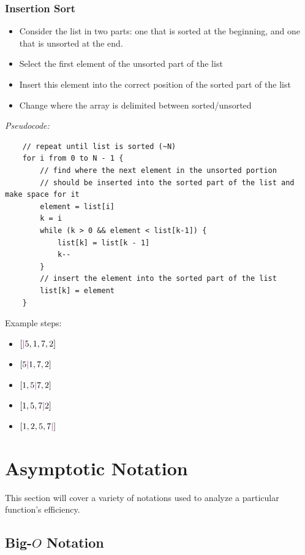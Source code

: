 \documentclass[12pt]{article}
\begin{document}
\subsubsection{Insertion Sort}
\begin{itemize}
    \item Consider the list in two parts: one that is sorted at the beginning, and one that is unsorted at the end.
    \item Select the first element of the unsorted part of the list
    \item Insert this element into the correct position of the sorted part of the list
    \item Change where the array is delimited between sorted/unsorted
\end{itemize}

\textit{Pseudocode:}

\begin{verbatim}
    // repeat until list is sorted (~N)
    for i from 0 to N - 1 {
        // find where the next element in the unsorted portion 
        // should be inserted into the sorted part of the list and make space for it
        element = list[i]
        k = i
        while (k > 0 && element < list[k-1]) {
            list[k] = list[k - 1]
            k--
        }
        // insert the element into the sorted part of the list 
        list[k] = element
    }
\end{verbatim}

Example steps:

\begin{itemize}
    \item $[\textcolor{violet}{|}5,1,7,2]$
    \item $[5\textcolor{violet}{|}1,7,2]$
    \item $[1,5\textcolor{violet}{|}7,2]$
    \item $[1,5,7\textcolor{violet}{|}2]$
    \item $[1,2,5,7\textcolor{violet}{|}]$
\end{itemize}

\section{Asymptotic Notation}

This section will cover a variety of notations used to analyze a particular function's efficiency.

\subsection{\texorpdfstring{Big-$O$ Notation}{TEXT}}
\end{document}
